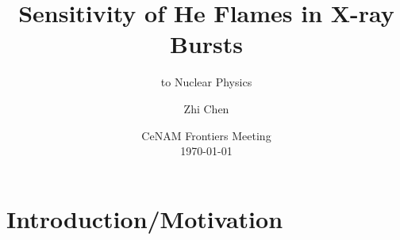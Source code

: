 \documentclass[
	11pt, %
]{beamer}
\title[He Flame Simulation in X-ray Bursts]{Sensitivity of He Flames in X-ray Bursts} %
\subtitle{to Nuclear Physics}%
\author[Zhi Chen]{Zhi Chen} %
\institute[SBU]{Stony Brook University \\ \smallskip \textit{}} %
\date[\today]{CeNAM Frontiers Meeting\\ \today} %
\begin{document}

\begin{frame}
	\titlepage %
\end{frame}



	


\section{Introduction/Motivation}

    
\end{document}
